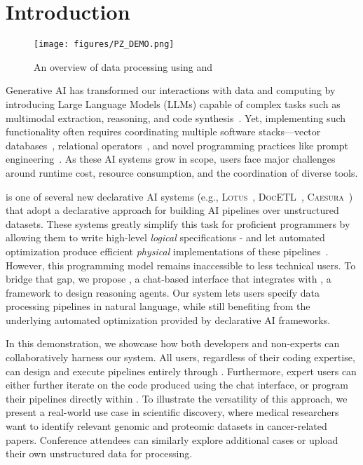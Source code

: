 \section{Introduction} \label{sec:introduction}

\begin{figure}
    \centering
    \texttt{[image: figures/PZ\_DEMO.png]}
        \vspace{-2em}
    \caption{An overview of data processing using \chat and \sys}
    \label{fig:architecture-overview}
\end{figure}

Generative AI has transformed our interactions with data and computing by introducing Large Language Models (LLMs) capable of complex tasks such as multimodal extraction, reasoning, and code synthesis~\cite{yao2022react,hong2023metagpt}. 
Yet, implementing such functionality often requires coordinating multiple software stacks—vector databases~\cite{lewis2020retrieval}, relational operators~\cite{palimpzestCIDR}, and novel programming practices like prompt engineering~\cite{dspy}. 
As these AI systems grow in scope, users face major challenges around runtime cost, resource consumption, and the coordination of diverse tools.

\sys{} is one of several new declarative AI systems (e.g., \textsc{Lotus}~\cite{patel2024lotus}, \textsc{DocETL}~\cite{shankar2024docetl}, \textsc{Caesura}~\cite{urban2024caesura}) that adopt a declarative approach for building AI pipelines over unstructured datasets. 
These systems greatly simplify this task for proficient programmers by allowing them to write high-level \emph{logical} specifications - and let automated optimization produce efficient \emph{physical} implementations of these pipelines~\cite{palimpzestCIDR}.
However, this programming model remains inaccessible to less technical users. 
To bridge that gap, we propose \chat{}, a chat-based interface that integrates \sys{} with \archytas{}, a framework to design reasoning agents.
Our system lets users specify data processing pipelines in natural language, while still benefiting from the underlying automated optimization provided by declarative AI frameworks.

In this demonstration, we showcase how both developers and non-experts can collaboratively harness our system. 
All users, regardless of their coding expertise, can design and execute pipelines entirely through \chat{}. 
Furthermore, expert users can either further iterate on the code produced using the chat interface, or program their pipelines directly within \sys{}.
To illustrate the versatility of this approach, we present a real-world use case in scientific discovery, where medical researchers want to identify relevant genomic and proteomic datasets in cancer-related papers. 
Conference attendees can similarly explore additional cases or upload their own unstructured data for processing.

